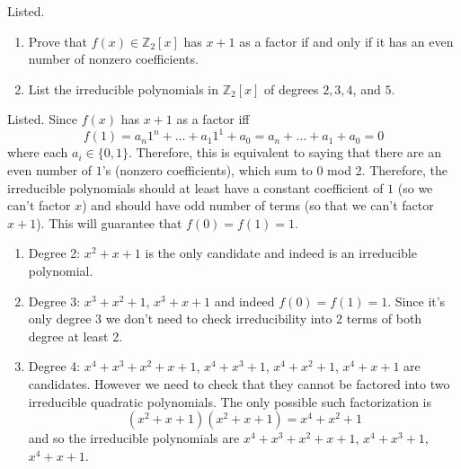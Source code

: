   \begin{exercise}[Shifrin 3.3.6]
    Listed. 
    \begin{enumerate}
      \item Prove that $f(x) \in \mathbb{Z}_2[x]$ has $x + 1$ as a factor if and only if it has an even number of nonzero coefficients.
      \item List the irreducible polynomials in $\mathbb{Z}_2[x]$ of degrees $2, 3, 4$, and $5$.
    \end{enumerate}
  \end{exercise}
  \begin{solution}
    Listed. 
    Since $f(x)$ has $x + 1$ as a factor iff 
    \begin{equation}
      f(1) = a_n 1^n + \ldots + a_1 1^1 + a_0 = a_n + \ldots + a_1 + a_0 = 0
    \end{equation}
    where each $a_i \in \{0, 1\}$. Therefore, this is equivalent to saying that there are an even number of $1$'s (nonzero coefficients), which sum to $0$ mod 2. Therefore, the irreducible polynomials should at least have a constant coefficient of $1$ (so we can't factor $x$) and should have odd number of terms (so that we can't factor $x+1$). This will guarantee that $f(0) = f(1) = 1$. 
    \begin{enumerate}
      \item Degree 2: $x^2 + x + 1$ is the only candidate and indeed is an irreducible polynomial. 

      \item Degree 3: $x^3 + x^2 + 1$, $x^3 + x + 1$ and indeed $f(0) = f(1) = 1$. Since it's only degree 3 we don't need to check irreducibility into 2 terms of both degree at least 2. 

      \item Degree 4: $x^4 + x^3 + x^2 + x + 1$, $x^4 + x^3 + 1$, $x^4 + x^2 + 1$, $x^4 + x + 1$ are candidates. However we need to check that they cannot be factored into two irreducible quadratic polynomials. The only possible such factorization is 
      \begin{equation}
        (x^2 + x + 1) (x^2 + x + 1) = x^4 + x^2 + 1 
      \end{equation}
      and so the irreducible polynomials are $x^4 + x^3 + x^2 + x + 1$, $x^4 + x^3 + 1$, $x^4 + x + 1$. 


\end{enumerate}
\end{solution}
